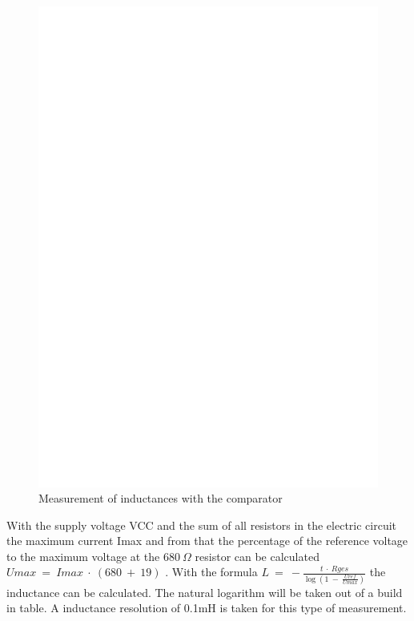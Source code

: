 \begin{figure}[H]
\centering
\includegraphics[]{../FIG/Inductance.eps}
\caption{Measurement of inductances with the comparator}
\label{fig:Inductance}
\end{figure}

With the supply voltage VCC and the sum of all resistors in the electric circuit the maximum current Imax and from
that the percentage of the reference voltage to the maximum voltage at the \(680~\Omega\) resistor can be calculated
\(Umax~=~Imax~\cdot~(680~+~19)\) .
With the formula \(L~=~-\frac{t~\cdot~Rges}{\log{(1~-~\frac{Uref}{Umax})}}\) the inductance can be calculated.
The natural logarithm will be taken out of a build in table.
A inductance resolution of 0.1mH is taken for this type of measurement.


